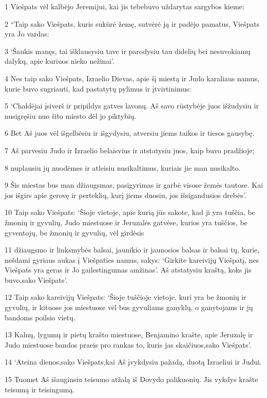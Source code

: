 \par 1 Viešpats vėl kalbėjo Jeremijui, kai jis tebebuvo uždarytas sargybos kieme: 
\par 2 “Taip sako Viešpats, kuris sukūrė žemę, sutvėrė ją ir padėjo pamatus, Viešpats yra Jo vardas: 
\par 3 ‘Šaukis manęs, tai išklausysiu tave ir parodysiu tau didelių bei nesuvokiamų dalykų, apie kuriuos nieko nežinai’. 
\par 4 Nes taip sako Viešpats, Izraelio Dievas, apie šį miestą ir Judo karaliaus namus, kurie buvo sugriauti, kad pastatytų pylimus ir įtvirtinimus: 
\par 5 ‘Chaldėjai įsiverš ir pripildys gatves lavonų. Aš savo rūstybėje juos išžudysiu ir nusigręšiu nuo šito miesto dėl jo piktybių. 
\par 6 Bet Aš juos vėl išgelbėsiu ir išgydysiu, atversiu jiems taikos ir tiesos gausybę. 
\par 7 Aš parvesiu Judo ir Izraelio belaisvius ir atstatysiu juos, kaip buvo pradžioje; 
\par 8 nuplausiu jų nuodėmes ir atleisiu nusikaltimus, kuriais jie man nusikalto. 
\par 9 Šis miestas bus man džiaugsmas, pasigyrimas ir garbė visose žemės tautose. Kai jos išgirs apie gerovę ir perteklių, kurį jiems duosiu, jos išsigandusios drebės’. 
\par 10 Taip sako Viešpats: ‘Šioje vietoje, apie kurią jūs sakote, kad ji yra tuščia, be žmonių ir gyvulių, Judo miestuose ir Jeruzalės gatvėse, kurios yra tuščios, be gyventojų, be žmonių ir gyvulių, vėl girdėsis 
\par 11 džiaugsmo ir linksmybės balsai, jaunikio ir jaunosios balsas ir balsai tų, kurie, nešdami gyriaus aukas į Viešpaties namus, sakys: ‘Girkite kareivijų Viešpatį, nes Viešpats yra geras ir Jo gailestingumas amžinas’. Aš atstatysiu kraštą, koks jis buvo,­sako Viešpats’. 
\par 12 Taip sako kareivijų Viešpats: ‘Šioje tuščioje vietoje, kuri yra be žmonių ir gyvulių, ir kituose jos miestuose vėl bus gyvuliams ganyklų, o ganytojams ir jų bandoms poilsio vietų. 
\par 13 Kalnų, lygumų ir pietų krašto miestuose, Benjamino krašte, apie Jeruzalę ir Judo miestuose bandos praeis pro rankas to, kuris jas skaičiuos,­sako Viešpats’. 
\par 14 ‘Ateina dienos,­sako Viešpats,­kai Aš įvykdysiu pažadą, duotą Izraeliui ir Judui. 
\par 15 Tuomet Aš išauginsiu teisumo atžalą iš Dovydo palikuonių. Jis vykdys krašte teisumą ir teisingumą. 
